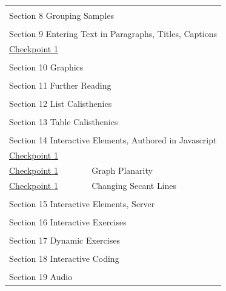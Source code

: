 \documentclass{sn-jnl}
\theoremstyle{thmstyleone}%
\theoremstyle{thmstyletwo}%
\theoremstyle{thmstylethree}%
\numberwithin{equation}{section}
\begin{document}
\begin{appendices}
\begin{longtable}[l]{ll}
\multicolumn{2}{l}{\null}\\[1.5ex] \multicolumn{2}{l}{\large Section 8 Grouping Samples}\\[0.5ex]
\multicolumn{2}{l}{\null}\\[1.5ex] \multicolumn{2}{l}{\large Section 9 Entering Text in Paragraphs, Titles, Captions}\\[0.5ex]
\hyperref[subsection-xml-escape-7]{Checkpoint 1}& \\
\multicolumn{2}{l}{\null}\\[1.5ex] \multicolumn{2}{l}{\large Section 10 Graphics}\\[0.5ex]
\multicolumn{2}{l}{\null}\\[1.5ex] \multicolumn{2}{l}{\large Section 11 Further Reading}\\[0.5ex]
\multicolumn{2}{l}{\null}\\[1.5ex] \multicolumn{2}{l}{\large Section 12 List Calisthenics}\\[0.5ex]
\multicolumn{2}{l}{\null}\\[1.5ex] \multicolumn{2}{l}{\large Section 13 Table Calisthenics}\\[0.5ex]
\multicolumn{2}{l}{\null}\\[1.5ex] \multicolumn{2}{l}{\large Section 14 Interactive Elements, Authored in Javascript}\\[0.5ex]
\hyperref[interactive-html5-canvas-5]{Checkpoint 1}& \\
\hyperref[section-interactive-authored-8-10]{Checkpoint 1}& Graph Planarity\\
\hyperref[svg-interactives-5]{Checkpoint 1}& Changing Secant Lines\\
\multicolumn{2}{l}{\null}\\[1.5ex] \multicolumn{2}{l}{\large Section 15 Interactive Elements, Server}\\[0.5ex]
\multicolumn{2}{l}{\null}\\[1.5ex] \multicolumn{2}{l}{\large Section 16 Interactive Exercises}\\[0.5ex]
\multicolumn{2}{l}{\null}\\[1.5ex] \multicolumn{2}{l}{\large Section 17 Dynamic Exercises}\\[0.5ex]
\multicolumn{2}{l}{\null}\\[1.5ex] \multicolumn{2}{l}{\large Section 18 Interactive Coding}\\[0.5ex]
\multicolumn{2}{l}{\null}\\[1.5ex] \multicolumn{2}{l}{\large Section 19 Audio}\\[0.5ex]

\end{longtable}
\end{appendices}
\end{document}
